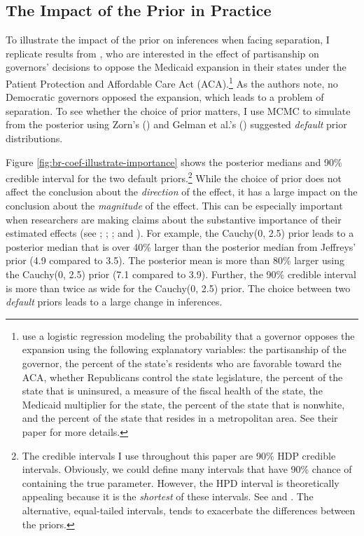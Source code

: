 \documentclass[12pt]{article}
\begin{document}
\subsection*{The Impact of the Prior in Practice}

To illustrate the impact of the prior on inferences when facing separation, I replicate results from \cite{BarrilleauxRainey2014}, who are interested in the effect of partisanship on governors' decisions to oppose the Medicaid expansion in their states under the Patient Protection and Affordable Care Act (ACA).\footnote{\cite{BarrilleauxRainey2014} use a logistic regression modeling the probability that a governor opposes the expansion using the following explanatory variables: the partisanship of the governor, the percent of the state's residents who are favorable toward the ACA, whether Republicans control the state legislature, the percent of the state that is uninsured, a measure of the fiscal health of the state, the Medicaid multiplier for the state, the percent of the state that is nonwhite, and the percent of the state that resides in a metropolitan area. See their paper for more details.} As the authors note, no Democratic governors opposed the expansion, which leads to a problem of separation. To see whether the choice of prior matters, I use MCMC to simulate from the posterior using Zorn's (\citeyear{Zorn2005}) and Gelman et al.'s (\citeyear{Gelmanetal2008}) suggested \emph{default} prior distributions. 

Figure \ref{fig:br-coef-illustrate-importance} shows the posterior medians and 90\% credible interval for the two default priors.\footnote{The credible intervals I use throughout this paper are 90\% HDP credible intervals. Obviously, we could define many intervals that have 90\% chance of containing the true parameter. However, the HPD interval is theoretically appealing because it is the \emph{shortest} of these intervals. See \citet[esp. pp. 48-51]{Gill2008} and \citet[esp. p. 448]{CasellaBerger2002}. The alternative, equal-tailed intervals, tends to exacerbate the differences between the priors.} While the choice of prior does not affect the conclusion about the \emph{direction} of the effect, it has a large impact on the conclusion about the \emph{magnitude} of the effect. This can be especially important when researchers are making claims about the substantive importance of their estimated effects (see \citealt{KingTomzWittenberg2000}; \citealt{Rainey2014}; \citealt{Gross2014}; and \citealt{McCaskeyRainey2014}). For example, the Cauchy(0, 2.5) prior leads to a posterior median that is over 40\% larger than the posterior median from Jeffreys' prior (4.9 compared to 3.5). The posterior mean is more than 80\% larger using the Cauchy(0, 2.5) prior (7.1 compared to 3.9). Further, the 90\% credible interval is more than twice as wide for the Cauchy(0, 2.5) prior. The choice between two \emph{default} priors leads to a large change in inferences.
\end{document}
